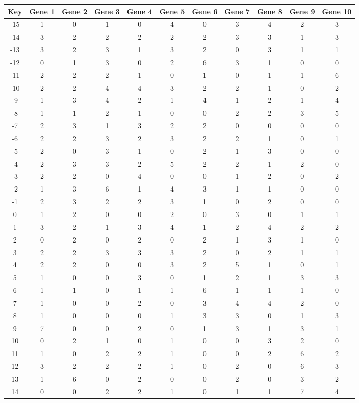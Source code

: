\begin{tabular}{|c|c|c|c|c|c|c|c|c|c|c|}
\hline
Key & Gene 1 & Gene 2 & Gene 3 & Gene 4 & Gene 5 & Gene 6 & Gene 7 & Gene 8 & Gene 9 & Gene 10 \\
\hline
-15 & 1 & 0 & 1 & 0 & 4 & 0 & 3 & 4 & 2 & 3 \\
-14 & 3 & 2 & 2 & 2 & 2 & 2 & 3 & 3 & 1 & 3 \\
-13 & 3 & 2 & 3 & 1 & 3 & 2 & 0 & 3 & 1 & 1 \\
-12 & 0 & 1 & 3 & 0 & 2 & 6 & 3 & 1 & 0 & 0 \\
-11 & 2 & 2 & 2 & 1 & 0 & 1 & 0 & 1 & 1 & 6 \\
-10 & 2 & 2 & 4 & 4 & 3 & 2 & 2 & 1 & 0 & 2 \\
-9 & 1 & 3 & 4 & 2 & 1 & 4 & 1 & 2 & 1 & 4 \\
-8 & 1 & 1 & 2 & 1 & 0 & 0 & 2 & 2 & 3 & 5 \\
-7 & 2 & 3 & 1 & 3 & 2 & 2 & 0 & 0 & 0 & 0 \\
-6 & 2 & 2 & 3 & 2 & 3 & 2 & 2 & 1 & 0 & 1 \\
-5 & 2 & 0 & 3 & 1 & 0 & 2 & 1 & 3 & 0 & 0 \\
-4 & 2 & 3 & 3 & 2 & 5 & 2 & 2 & 1 & 2 & 0 \\
-3 & 2 & 2 & 0 & 4 & 0 & 0 & 1 & 2 & 0 & 2 \\
-2 & 1 & 3 & 6 & 1 & 4 & 3 & 1 & 1 & 0 & 0 \\
-1 & 2 & 3 & 2 & 2 & 3 & 1 & 0 & 2 & 0 & 0 \\
0 & 1 & 2 & 0 & 0 & 2 & 0 & 3 & 0 & 1 & 1 \\
1 & 3 & 2 & 1 & 3 & 4 & 1 & 2 & 4 & 2 & 2 \\
2 & 0 & 2 & 0 & 2 & 0 & 2 & 1 & 3 & 1 & 0 \\
3 & 2 & 2 & 3 & 3 & 3 & 2 & 0 & 2 & 1 & 1 \\
4 & 2 & 2 & 0 & 0 & 3 & 2 & 5 & 1 & 0 & 1 \\
5 & 1 & 0 & 0 & 3 & 0 & 1 & 2 & 1 & 3 & 3 \\
6 & 1 & 1 & 0 & 1 & 1 & 6 & 1 & 1 & 1 & 0 \\
7 & 1 & 0 & 0 & 2 & 0 & 3 & 4 & 4 & 2 & 0 \\
8 & 1 & 0 & 0 & 0 & 1 & 3 & 3 & 0 & 1 & 3 \\
9 & 7 & 0 & 0 & 2 & 0 & 1 & 3 & 1 & 3 & 1 \\
10 & 0 & 2 & 1 & 0 & 1 & 0 & 0 & 3 & 2 & 0 \\
11 & 1 & 0 & 2 & 2 & 1 & 0 & 0 & 2 & 6 & 2 \\
12 & 3 & 2 & 2 & 2 & 1 & 0 & 2 & 0 & 6 & 3 \\
13 & 1 & 6 & 0 & 2 & 0 & 0 & 2 & 0 & 3 & 2 \\
14 & 0 & 0 & 2 & 2 & 1 & 0 & 1 & 1 & 7 & 4 \\
\hline
\end{tabular}
